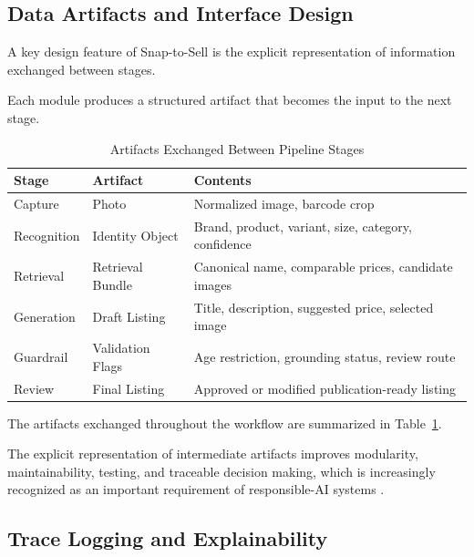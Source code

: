 \documentclass[conference]{IEEEtran}
\begin{document}
\subsection{Data Artifacts and Interface Design}

A key design feature of Snap-to-Sell is the explicit representation
of information exchanged between stages.

Each module produces a structured artifact that becomes the input to
the next stage.

\begin{table}[t]
\caption{Artifacts Exchanged Between Pipeline Stages}
\label{tab:artifacts}
\centering
\small
\begin{tabular}{lll}
\toprule
Stage & Artifact & Contents \\
\midrule

Capture &
Photo &
Normalized image, barcode crop \\

Recognition &
Identity Object &
Brand, product, variant, size, category, confidence \\

Retrieval &
Retrieval Bundle &
Canonical name, comparable prices, candidate images \\

Generation &
Draft Listing &
Title, description, suggested price, selected image \\

Guardrail &
Validation Flags &
Age restriction, grounding status, review route \\

Review &
Final Listing &
Approved or modified publication-ready listing \\

\bottomrule
\end{tabular}
\end{table}

The artifacts exchanged throughout the workflow are summarized in
Table~\ref{tab:artifacts}.

The explicit representation of intermediate artifacts improves
modularity, maintainability, testing, and traceable decision making,
which is increasingly recognized as an important requirement of
responsible-AI systems \cite{li2024modict}.

\subsection{Trace Logging and Explainability}
\end{document}
